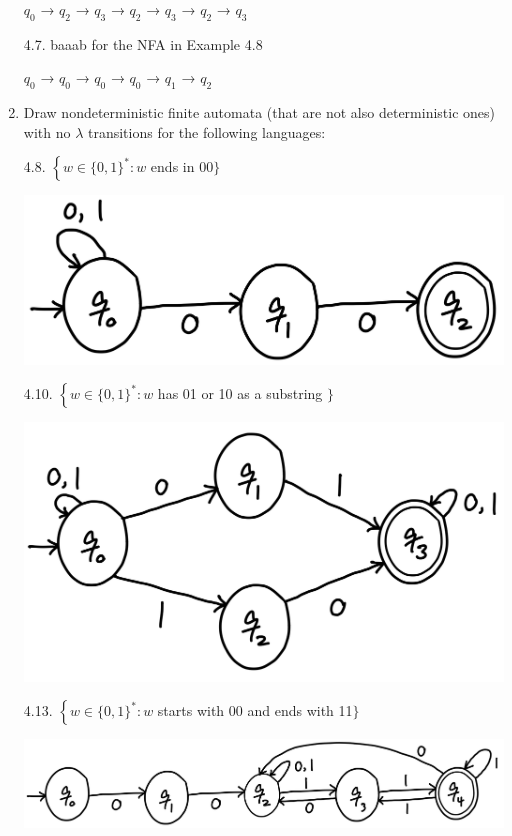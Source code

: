 \documentclass[10pt]{article}
\begin{document}
\begin{enumerate}[label={}]
            $q_0$ → $q_2$ → $q_3$ → $q_2$ → $q_3$ → $q_2$ → $q_3$

            4.7. baaab for the NFA in Example 4.8

            $q_0$ → $q_0$ → $q_0$ → $q_0$ → $q_1$ → $q_2$


      \item Draw nondeterministic finite automata (that are not also deterministic ones) with no $\lambda$ transitions for the following languages:

            4.8. $\left\{w \in\{0,1\}^*: w\right.$ ends in 00$\}$

            \includegraphics[scale=0.3]{4.8}


            4.10. $\left\{w \in\{0,1\}^*: w\right.$ has 01 or 10 as a substring $\}$

            \includegraphics[scale=0.3]{4.10}


            4.13. $\left\{w \in\{0,1\}^*: w\right.$ starts with 00 and ends with 11$\}$

            \includegraphics[scale=0.3]{4.13}



\end{enumerate}
\end{document}
